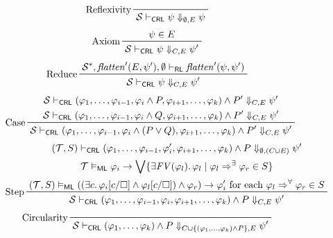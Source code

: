 \documentclass{article}
\newcommand{\RL}{\mathsf{RL}}
\newcommand{\ML}{\mathsf{ML}}
\newcommand{\CRL}{\mathsf{CRL}}
\begin{document}
\begin{figure}
    \centering
    \begin{align*}
    & \prftree[l]{Reflexivity}{\mathcal{S} \vdash_\CRL \psi \Downarrow_{\emptyset,E} \psi}
    \end{align*}
    \begin{align*}
    & \prftree[l]{Axiom}{\psi \in E}{\mathcal{S} \vdash_\CRL \psi \Downarrow_{C,E} \psi^\prime}
    \end{align*}
    \begin{align*}
    & \prftree[l]{Reduce}
      {\mathcal{S}^*, \mathit{flatten}^\prime(E, \psi^\prime), \emptyset \vdash_\RL
        \mathit{flatten}^\prime(\psi, \psi^\prime) }
      {\mathcal{S} \vdash_\CRL \psi \Downarrow_{C,E} \psi^\prime}
    \end{align*}
    \begin{align*}
    & \prftree[l]{Case}
    { \prfStackPremises
      {\mathcal{S} \vdash_\CRL (\varphi_1, \ldots, \varphi_{i-1}, \varphi_i \land P, \varphi_{i+1}, \ldots, \varphi_k) \land P^\prime \Downarrow_{C, E} \psi^\prime }
      {\mathcal{S} \vdash_\CRL (\varphi_1, \ldots, \varphi_{i-1}, \varphi_i \land Q, \varphi_{i+1}, \ldots, \varphi_k) \land P^\prime \Downarrow_{C, E} \psi^\prime }
    }
    {\mathcal{S} \vdash_\CRL (\varphi_1, \ldots, \varphi_{i-1}, \varphi_i \land (P \lor Q), \varphi_{i+1}, \ldots, \varphi_k) \land P^\prime \Downarrow_{C, E} \psi^\prime}
    \end{align*}
    \begin{align*}
    & \prftree[l]{Step}
    { \prfStackPremises
       {  (\mathcal{T}, S) \vdash_\CRL (\varphi_1, \ldots, \varphi_{i-1}, \varphi_i^\prime, \varphi_{i+1}, \ldots,    \varphi_k)
          \land P
          \Downarrow_{\emptyset, (C \cup E)} \psi^\prime
      }
      { \mathcal{T} \vDash_{\ML} \varphi_i \rightarrow \bigvee \{ \exists \mathit{FV}(\varphi_l).\, \varphi_l \mid \varphi_l \Rightarrow^\exists \varphi_r \in S \} }
      { (\mathcal{T}, S) \vDash_\ML ((\exists c.\, \varphi_i[c/\square] \land \varphi_l[c/\square]) \land \varphi_r) \rightarrow \varphi_i^\prime  \mbox{ for each } \varphi_l \Rightarrow^\forall \varphi_r \in S }
    }
    {\mathcal{S} \vdash_\CRL (\varphi_1, \ldots, \varphi_{i-1}, \varphi_i, \varphi_{i+1}, \ldots, \varphi_k) \land P \Downarrow_{C, E} \psi^\prime}
    \end{align*}
    \begin{align*}
    & \prftree[l]{Circularity}
      { \mathcal{S} \vdash_\CRL (\varphi_1, \ldots, \varphi_k) \land P \Downarrow_{C \cup \{ (\varphi_1, \ldots, \varphi_k) \land P \} , E} \psi^\prime}

\end{align*}
\end{figure}
\end{document}
